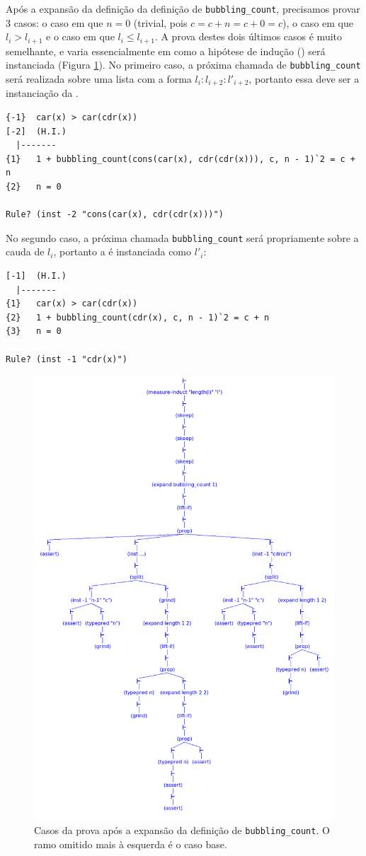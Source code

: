 Após a expansão da definição da definição de \texttt{bubbling\_count}, precisamos
provar 3 casos: o caso em que $n=0$ (trivial, pois $c = c + n = c + 0 = c$), 
o caso em que $l_i > l_{i+1}$ e o caso em que $l_i \leq l_{i+1}$. A prova destes dois
últimos casos é muito semelhante, e varia essencialmente em como a hipótese de indução
(\HI) será instanciada (Figura \ref{fig:bubbling2}). No primeiro caso,
a próxima chamada de \texttt{bubbling\_count} será realizada sobre uma lista com a
forma $l_i:l_{i+2}:l'_{i+2}$, portanto essa deve ser a instanciação da \HI.

\begin{lstlisting}
{-1}  car(x) > car(cdr(x))
[-2]  (H.I.)
  |-------
{1}   1 + bubbling_count(cons(car(x), cdr(cdr(x))), c, n - 1)`2 = c + n
{2}   n = 0

Rule? (inst -2 "cons(car(x), cdr(cdr(x)))")
\end{lstlisting} 

No segundo caso, a próxima chamada \texttt{bubbling\_count} será propriamente sobre
a cauda de $l_i$, portanto a \HI é instanciada como $l'_i$:

\begin{lstlisting}
[-1]  (H.I.)
  |-------
{1}   car(x) > car(cdr(x))
{2}   1 + bubbling_count(cdr(x), c, n - 1)`2 = c + n
{3}   n = 0

Rule? (inst -1 "cdr(x)")
\end{lstlisting} 

\begin{figure}[h!]
    \centering
    \includegraphics[width=0.75\linewidth,trim={8cm 20cm 4cm 10cm},clip]{figures/bubbling-counts-n.png}
    \caption{Casos da prova após a expansão da definição de \texttt{bubbling\_count}. O
    ramo omitido mais à esquerda é o caso base.}
    \label{fig:bubbling2}
\end{figure}


